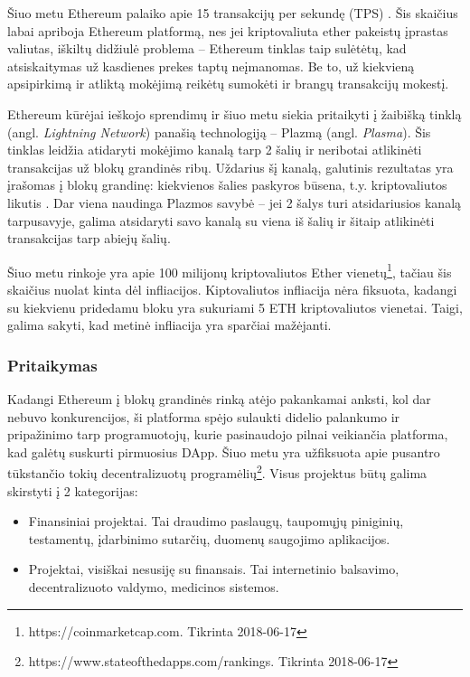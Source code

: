 \documentclass{VUMIFPSkursinis}
\begin{document}
Šiuo metu Ethereum palaiko apie 15 transakcijų per sekundę (TPS) \cite{park2017block}. Šis skaičius labai apriboja Ethereum platformą, nes jei kriptovaliuta ether pakeistų įprastas valiutas, iškiltų didžiulė problema – Ethereum tinklas taip sulėtėtų, kad atsiskaitymas už kasdienes prekes taptų neįmanomas. Be to, už kiekvieną apsipirkimą ir atliktą mokėjimą reikėtų sumokėti ir brangų transakcijų mokestį. 

Ethereum kūrėjai ieškojo sprendimų ir šiuo metu siekia pritaikyti į žaibišką tinklą (angl. \textit{Lightning Network}) \cite{poon2016bitcoin} panašią technologiją – Plazmą (angl. \textit{Plasma}). Šis tinklas leidžia atidaryti mokėjimo kanalą tarp 2 šalių ir neribotai atlikinėti transakcijas už blokų grandinės ribų. Uždarius šį kanalą, galutinis rezultatas yra įrašomas į blokų grandinę: kiekvienos šalies paskyros būsena, t.y. kriptovaliutos likutis \cite{poon2017plasma}. Dar viena naudinga Plazmos savybė – jei 2 šalys turi atsidariusios kanalą tarpusavyje, galima atsidaryti savo kanalą su viena iš šalių ir šitaip atlikinėti transakcijas tarp abiejų šalių.

Šiuo metu rinkoje yra apie 100 milijonų kriptovaliutos Ether vienetų\footnote{https://coinmarketcap.com. Tikrinta 2018-06-17}, tačiau šis skaičius nuolat kinta dėl infliacijos. Kiptovaliutos infliacija nėra fiksuota, kadangi su kiekvienu pridedamu bloku yra sukuriami 5 ETH kriptovaliutos vienetai. Taigi, galima sakyti, kad metinė infliacija yra sparčiai mažėjanti.

\subsubsection{Pritaikymas}
Kadangi Ethereum į blokų grandinės rinką atėjo pakankamai anksti, kol dar nebuvo konkurencijos, ši platforma spėjo sulaukti didelio palankumo ir pripažinimo tarp programuotojų, kurie pasinaudojo pilnai veikiančia platforma, kad galėtų suskurti pirmuosius DApp. Šiuo metu yra užfiksuota apie pusantro tūkstančio tokių decentralizuotų programėlių\footnote{https://www.stateofthedapps.com/rankings. Tikrinta 2018-06-17}. Visus projektus būtų galima skirstyti į 2 kategorijas:  \begin{itemize}
    \item Finansiniai projektai. Tai draudimo paslaugų, taupomųjų piniginių, testamentų, įdarbinimo sutarčių, duomenų saugojimo aplikacijos.
    \item Projektai, visiškai nesusiję su finansais. Tai internetinio balsavimo, decentralizuoto valdymo, medicinos sistemos.
\end{itemize}
\end{document}
